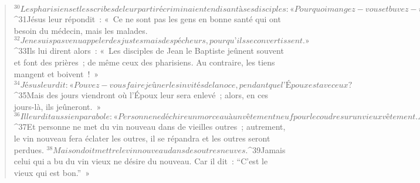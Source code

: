\begin{verse}
${}^{30}Les pharisiens et les scribes de leur parti récriminaient en disant à ses disciples : « Pourquoi mangez-vous et buvez-vous avec les publicains et les pécheurs ? » 
${}^{31}Jésus leur répondit : « Ce ne sont pas les gens en bonne santé qui ont besoin du médecin, mais les malades. 
${}^{32}Je ne suis pas venu appeler des justes mais des pécheurs, pour qu’ils se convertissent. »
${}^{33}Ils lui dirent alors : « Les disciples de Jean le Baptiste jeûnent souvent et font des prières ; de même ceux des pharisiens. Au contraire, les tiens mangent et boivent ! » 
${}^{34}Jésus leur dit : « Pouvez-vous faire jeûner les invités de la noce, pendant que l’Époux est avec eux ? 
${}^{35}Mais des jours viendront où l’Époux leur sera enlevé ; alors, en ces jours-là, ils jeûneront. »
${}^{36}Il leur dit aussi en parabole : « Personne ne déchire un morceau à un vêtement neuf pour le coudre sur un vieux vêtement. Autrement, on aura déchiré le neuf, et le morceau qui vient du neuf ne s’accordera pas avec le vieux. 
${}^{37}Et personne ne met du vin nouveau dans de vieilles outres ; autrement, le vin nouveau fera éclater les outres, il se répandra et les outres seront perdues. 
${}^{38}Mais on doit mettre le vin nouveau dans des outres neuves. 
${}^{39}Jamais celui qui a bu du vin vieux ne désire du nouveau. Car il dit : “C’est le vieux qui est bon.” »
      

\end{verse}
